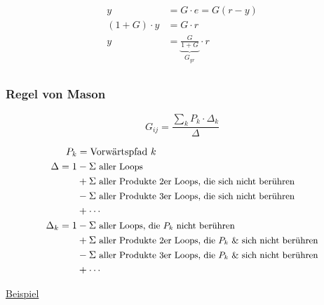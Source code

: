 \documentclass[
  10pt,
  a4paper,
]{article}
\numberwithin{equation}{section}
\begin{document}
\begin{multicols}{2}
\begin{center}
\end{center}

\[
\begin{split}
y &= G\cdot e = G(r-y)\\
(1+G)\cdot y &= G\cdot r \\
y &= \underbrace{\frac{G}{1+G}}_{G_{yr}} \cdot r\\
\end{split}
\]

\hypertarget{regel-von-mason}{%
\subsubsection{Regel von Mason}\label{regel-von-mason}}

\[
G_{ij} = \frac{\sum_k P_k\cdot\Delta_k}{\Delta}
\]

\[
\begin{split}
P_k &= \text{Vorwärtspfad } k\\
\Delta = 1 &- \small{\Sigma\text{ aller Loops}} \\
           &+ \small{\Sigma\text{ aller Produkte 2er Loops, die sich nicht berühren}} \\
           &- \small{\Sigma\text{ aller Produkte 3er Loops, die sich nicht berühren}} \\
           &+ \cdots \\
\Delta_k = 1 &- \small{\Sigma\text{ aller Loops, die $P_k$ nicht berühren}} \\
             &+ \small{\Sigma\text{ aller Produkte 2er Loops, die $P_k$ \& sich nicht berühren}} \\
             &- \small{\Sigma\text{ aller Produkte 3er Loops, die $P_k$ \& sich nicht berühren}} \\
             &+ \cdots \\
\end{split}
\]

\ul{Beispiel}

\begin{figure}[H]


\end{figure}
\end{multicols}
\end{document}
